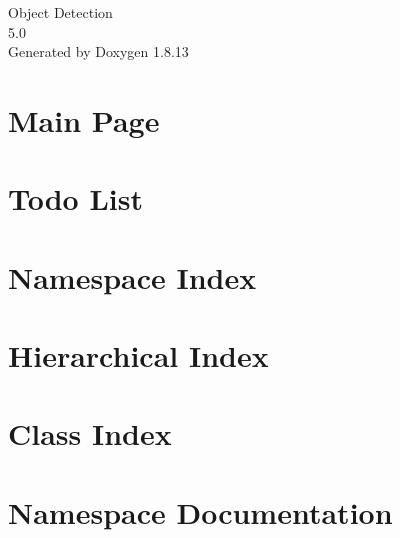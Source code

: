 \documentclass[twoside]{book}
\newcommand{\+}{\discretionary{\mbox{\scriptsize$\hookleftarrow$}}{}{}}
\newcommand{\clearemptydoublepage}{%
  \newpage{\pagestyle{empty}\cleardoublepage}%
}
\begin{document}
\hypersetup{pageanchor=false,
             bookmarksnumbered=true,
             pdfencoding=unicode
            }
\begin{titlepage}
\vspace*{7cm}
\begin{center}%
{\Large Object Detection \\[1ex]\large 5.\+0 }\\
\vspace*{1cm}
{\large Generated by Doxygen 1.8.13}\\
\end{center}
\end{titlepage}
\clearemptydoublepage
{}
\tableofcontents
\clearemptydoublepage
{}
\hypersetup{pageanchor=true}

\chapter{Main Page}
\label{index}\hypertarget{index}{}
\chapter{Todo List}
\label{todo}

\chapter{Namespace Index}

\chapter{Hierarchical Index}

\chapter{Class Index}

\chapter{Namespace Documentation}


\end{document}
